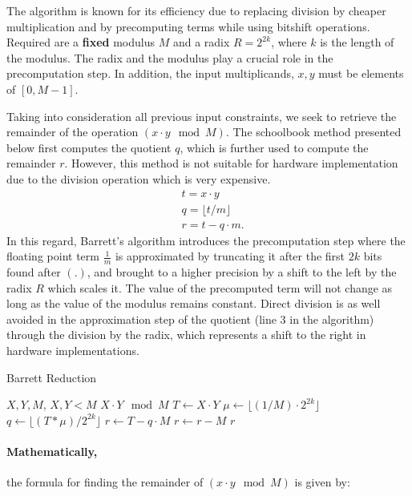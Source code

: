 \documentclass[11pt,
  titlepage=false,
  abstract=on,
]{scrreprt}
\begin{document}
The algorithm is known for its efficiency due to replacing division by cheaper multiplication and by precomputing terms while using bitshift operations.
Required are a \textbf{fixed} modulus $M$ and a radix $R = 2^{2k}$, where $k$ is the length of the modulus. The radix and the modulus play a crucial role in the precomputation step.
In addition, the input multiplicands, $x, y$ must be elements of $[0, M-1]$.

Taking into consideration all previous input constraints, we seek to retrieve the remainder of the operation $(x \cdot y \mod M)$.
The schoolbook method presented below \cite{ModArith} first computes the quotient $q$, which is further used to compute the remainder $r$.
However, this method is not suitable for hardware implementation due to the division operation which is very expensive.
\begin{align*}
  &t = x \cdot y\\
  &q = \lfloor t / m \rfloor\\
  &r = t - q \cdot m.
\end{align*}
In this regard, Barrett's algorithm introduces the precomputation step where the floating point term $\frac{1}{m}$ is approximated by truncating it after the first $2k$ bits found after $(.)$,
and brought to a higher precision by a shift to the left by the radix $R$ which scales it. The value of the precomputed term will not change as long as the value of the modulus remains constant. \cite{4272869}
Direct division is as well avoided in the approximation step of the quotient (line 3 in the algorithm) through the division by the radix, which represents a shift to the right in hardware implementations.

\begin{algorithm}
  \caption{Barrett Reduction}
  \label{alg:montgomery}
  \begin{algorithmic}[1]
  \REQUIRE \( X, Y, M \), \( X, Y < M \)
  \renewcommand{\algorithmicensure}{\textbf{Output:}}
  \ENSURE \(X \cdot Y \mod M \)
  \STATE \( T \leftarrow X \cdot Y \)
  \STATE \( \mu \leftarrow \lfloor(1 / M) \cdot 2^{2k}\rfloor \)
  \STATE \( q \leftarrow \lfloor (T * \mu) / 2^{2k} \rfloor \)
  \STATE \( r \leftarrow T - q \cdot M \)
      \STATE \( r \leftarrow r - M \)
  \ENDIF
  \RETURN \( r \)
  \end{algorithmic}
\end{algorithm}

\paragraph{Mathematically,} the formula for finding the remainder of $(x \cdot y \mod M)$ is given by:
\end{document}
